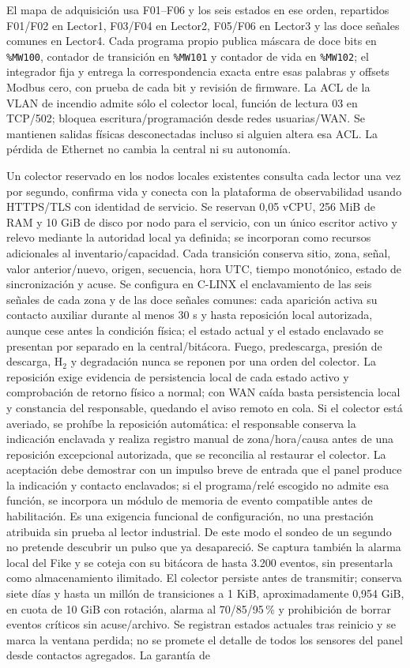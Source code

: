El mapa de adquisición usa F01--F06 y los seis estados en ese orden, repartidos F01/F02 en Lector1, F03/F04 en Lector2, F05/F06 en Lector3 y las doce señales comunes en Lector4. Cada programa propio publica máscara de doce bits en \texttt{\%MW100}, contador de transición en \texttt{\%MW101} y contador de vida en \texttt{\%MW102}; el integrador fija y entrega la correspondencia exacta entre esas palabras y offsets Modbus cero, con prueba de cada bit y revisión de firmware. La ACL de la VLAN de incendio admite sólo el colector local, función de lectura 03 en TCP/502; bloquea escritura/programación desde redes usuarias/WAN. Se mantienen salidas físicas desconectadas incluso si alguien altera esa ACL. La pérdida de Ethernet no cambia la central ni su autonomía.

Un colector reservado en los nodos locales existentes consulta cada lector una vez por segundo, confirma vida y conecta con la plataforma de observabilidad usando HTTPS/TLS con identidad de servicio. Se reservan 0,05 vCPU, 256 MiB de RAM y 10 GiB de disco por nodo para el servicio, con un único escritor activo y relevo mediante la autoridad local ya definida; se incorporan como recursos adicionales al inventario/capacidad. Cada transición conserva sitio, zona, señal, valor anterior/nuevo, origen, secuencia, hora UTC, tiempo monotónico, estado de sincronización y acuse. Se configura en C-LINX el enclavamiento de las seis señales de cada zona y de las doce señales comunes: cada aparición activa su contacto auxiliar durante al menos 30 s y hasta reposición local autorizada, aunque cese antes la condición física; el estado actual y el estado enclavado se presentan por separado en la central/bitácora. Fuego, predescarga, presión de descarga, H$_2$ y degradación nunca se reponen por una orden del colector. La reposición exige evidencia de persistencia local de cada estado activo y comprobación de retorno físico a normal; con WAN caída basta persistencia local y constancia del responsable, quedando el aviso remoto en cola. Si el colector está averiado, se prohíbe la reposición automática: el responsable conserva la indicación enclavada y realiza registro manual de zona/hora/causa antes de una reposición excepcional autorizada, que se reconcilia al restaurar el colector. La aceptación debe demostrar con un impulso breve de entrada que el panel produce la indicación y contacto enclavados; si el programa/relé escogido no admite esa función, se incorpora un módulo de memoria de evento compatible antes de habilitación. Es una exigencia funcional de configuración, no una prestación atribuida sin prueba al lector industrial. De este modo el sondeo de un segundo no pretende descubrir un pulso que ya desapareció. Se captura también la alarma local del Fike y se coteja con su bitácora de hasta 3.200 eventos, sin presentarla como almacenamiento ilimitado. El colector persiste antes de transmitir; conserva siete días y hasta un millón de transiciones a 1 KiB, aproximadamente 0,954 GiB, en cuota de 10 GiB con rotación, alarma al 70/85/95\,\% y prohibición de borrar eventos críticos sin acuse/archivo. Se registran estados actuales tras reinicio y se marca la ventana perdida; no se promete el detalle de todos los sensores del panel desde contactos agregados. La garantía de 